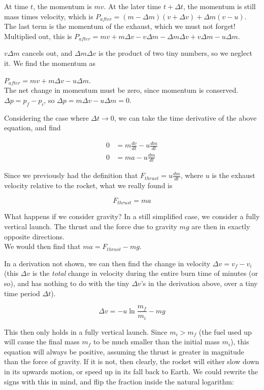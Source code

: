 At time $t$, the momentum is $m v$. At the later time $t + \Delta t$, the momentum is still mass times velocity, which is $P_{after} = (m - \Delta m)(v + \Delta v) + \Delta m(v - u)$. The last term is the momentum of the exhaust, which we must not forget!\\
Multiplied out, this is $P_{after} = m v + m \Delta v - v \Delta m - \Delta m \Delta v + v \Delta m - u \Delta m$. 

$v \Delta m$ cancels out, and $\Delta m \Delta v$ is the product of two tiny numbers, so we neglect it. We find the momentum as

$P_{after} = m v + m \Delta v - u \Delta m$.\\
The net change in momentum must be zero, since momentum is conserved. $\Delta p = p_f - p_i$, so $\Delta p = m \Delta v - u \Delta m = 0$.

Considering the case where $\Delta t \to 0$, we can take the time derivative of the above equation, and find

\begin{align}
0 &= m \frac{dv}{dt} - u \frac{dm}{dt}\\
0 &= m a - u \frac{dm}{dt}
\end{align}

Since we previously had the definition that $\displaystyle F_{thrust} = u \frac{dm}{dt}$, where $u$ is the exhaust velocity relative to the rocket, what we really found is

\begin{equation}
F_{thrust} = m a
\end{equation}

What happens if we consider gravity? In a still simplified case, we consider a fully vertical launch. The thrust and the force due to gravity $m g$ are then in exactly opposite directions.\\
We would then find that $m a = F_{thrust} - m g$.

In a derivation not shown, we can then find the change in velocity $\Delta v = v_f - v_i$ (this $\Delta v$ is the \emph{total} change in velocity during the entire burn time of minutes (or so), and has nothing to do with the tiny $\Delta v$'s in the derivation above, over a tiny time period $\Delta t$).

\begin{equation}
\Delta v = -u \ln \frac{m_f}{m_i} - m g
\end{equation}

This then only holds in a fully vertical launch. Since $m_i > m_f$ (the fuel used up will cause the final mass $m_f$ to be much smaller than the initial mass $m_i$), this equation will always be positive, assuming the thrust is greater in magnitude than the force of gravity. If it is not, then clearly, the rocket will either slow down in its upwards motion, or speed up in its fall back to Earth. We could rewrite the signs with this in mind, and flip the fraction inside the natural logarithm:

